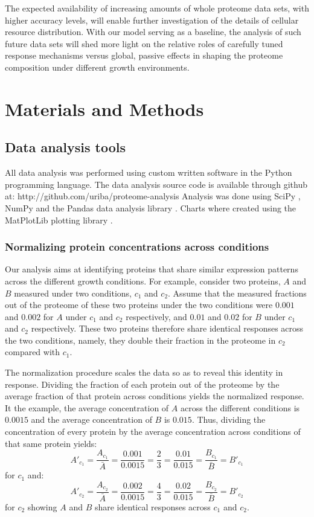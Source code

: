 \documentclass[a4paper]{article}
\begin{document}
The expected availability of increasing amounts of whole proteome data sets, with higher accuracy levels, will enable further investigation of the details of cellular resource distribution.
With our model serving as a baseline, the analysis of such future data sets will shed more light on the relative roles of carefully tuned response mechanisms versus global, passive effects in shaping the proteome composition under different growth environments.

\section{Materials and Methods}
\subsection{Data analysis tools}
All data analysis was performed using custom written software in the Python programming language.
The data analysis source code is available through github at: http://github.com/uriba/proteome-analysis
Analysis was done using SciPy \cite{Oliphant2007}, NumPy \cite{Community2011} and the Pandas data analysis library \cite{McKinney2011}.
Charts where created using the MatPlotLib plotting library \cite{Hunter2007}.

\subsubsection{Normalizing protein concentrations across conditions}
\label{concacrossconds} 
Our analysis aims at identifying proteins that share similar expression patterns across the different growth conditions.
For example, consider two proteins, $A$ and $B$ measured under two conditions, $c_1$ and $c_2$.
Assume that the measured fractions out of the proteome of these two proteins under the two conditions were $0.001$ and $0.002$ for $A$ under $c_1$ and $c_2$ respectively, and $0.01$ and $0.02$ for $B$ under $c_1$ and $c_2$ respectively.
These two proteins therefore share identical responses across the two conditions, namely, they double their fraction in the proteome in $c_2$ compared with $c_1$.

The normalization procedure scales the data so as to reveal this identity in response.
Dividing the fraction of each protein out of the proteome by the average fraction of that protein across conditions yields the normalized response.
It the example, the average concentration of $A$ across the different conditions is $0.0015$ and the average concentration of $B$ is $0.015$.
Thus, dividing the concentration of every protein by the average concentration across conditions of that same protein yields:
\[
A'_{c_1}=\frac{A_{c_1}}{\bar{A}}=\frac{0.001}{0.0015}=\frac{2}{3}=\frac{0.01}{0.015}=\frac{B_{c_1}}{\bar{B}}=B'_{c_1}
\]
for $c_1$ and:
\[
A'_{c_2}=\frac{A_{c_2}}{\bar{A}}=\frac{0.002}{0.0015}=\frac{4}{3}=\frac{0.02}{0.015}=\frac{B_{c_2}}{\bar{B}}=B'_{c_2}
\]
for $c_2$ showing $A$ and $B$ share identical responses across $c_1$ and $c_2$.
\end{document}
